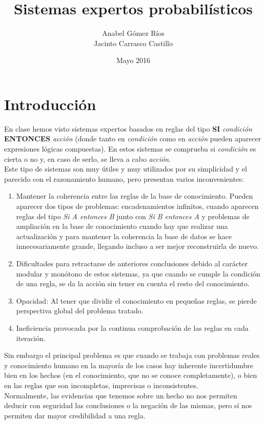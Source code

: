 \documentclass{article}
\title{Sistemas expertos probabilísticos}
\author{Anabel Gómez Ríos\\
        Jacinto Carrasco Castillo}
\date{Mayo 2016}
\theoremstyle{definition_wo_parentheses}
\begin{document}
\maketitle

\section{Introducción}
En clase hemos visto sistemas expertos basados en reglas del tipo \textbf{SI} \textit{condición} \textbf{ENTONCES} \textit{acción} (donde tanto en \textit{condición} como en \textit{acción} pueden aparecer expresiones lógicas compuestas). En estos sistemas se comprueba si \textit{condición} es cierta o no y, en caso de serlo, se lleva a cabo \textit{acción}.\\

Este tipo de sistemas son muy útiles y muy utilizados por su simplicidad y el parecido con el razonamiento humano, pero presentan varios inconvenientes:
\begin{enumerate}
    \item Mantener la coherencia entre las reglas de la base de conocimiento. Pueden aparecer dos tipos de problemas: encadenamientos infinitos, cuando aparecen reglas del tipo \textit{Si A entonces B} junto con \textit{Si B entonces A} y problemas de ampliación en la base de conocimiento cuando hay que realizar una actualización y para mantener la coherencia la base de datos se hace innecesariamente grande, llegando incluso a ser mejor reconstruirla de nuevo.
    \item Dificultades para retractarse de anteriores conclusiones debido al carácter modular y monótono de estos sistemas, ya que cuando se cumple la condición de una regla, se da la acción sin tener en cuenta el resto del conocimiento.
    \item Opacidad: Al tener que dividir el conocimiento en pequeñas reglas, se pierde perspectiva global del problema tratado.
    \item Ineficiencia provocada por la continua comprobación de las reglas en cada iteración.
\end{enumerate}

Sin embargo el principal problema es que cuando se trabaja con problemas reales y conocimiento humano en la mayoría de los casos hay inherente incertidumbre bien en los hechos (en el conocimiento, que no se conoce completamente), o bien en las reglas que son incompletas, imprecisas o inconsistentes.\\
Normalmente, las evidencias que tenemos sobre un hecho no nos permiten deducir con seguridad las conclusiones o la negación de las mismas, pero sí nos permiten dar mayor credibilidad a una regla.
\end{document}
